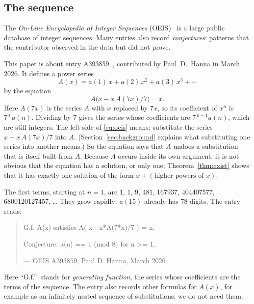 \documentclass[11pt,a4paper]{article}
\theoremstyle{definition}
\theoremstyle{remark}
\begin{document}
\subsection{The sequence}\label{sec:sequence}
The \emph{On-Line Encyclopedia of Integer Sequences} (OEIS)~\cite{oeisdb} is a large public database of integer
sequences. Many
entries also record \emph{conjectures}: patterns that the contributor observed in the data but did not prove.

This paper is about entry A393859~\cite{oeis}, contributed by Paul~D.~Hanna in March 2026. It defines a power series
\[
A(x)=a(1)\,x+a(2)\,x^2+a(3)\,x^3+\cdots
\]
by the equation
\begin{equation}\label{eq:oeis}
A\bigl(x-x\,A(7x)/7\bigr)=x.
\end{equation}
Here $A(7x)$ is the series $A$ with $x$ replaced by $7x$, so its coefficient of $x^n$ is
$7^n\,a(n)$. Dividing by $7$ gives the series whose coefficients are
$7^{\,n-1}a(n)$, which are still integers. The left side of \eqref{eq:oeis} means: substitute the series
$x-x\,A(7x)/7$ into $A$. (Section~\ref{sec:background} explains what substituting one
series into another means.) So the equation says that $A$ undoes a substitution that is itself built from $A$. Because
$A$ occurs inside its own argument, it is not obvious that the equation has a solution, or only one; Theorem~\ref{thm:exist}
shows that it has exactly one solution of the form $x+(\text{higher powers of }x)$.

The first terms, starting at $n=1$, are 1, 1, 9, 481, 167937, 404407577, 6800120127457, \dots{} They grow rapidly: $a(15)$
already has 78 digits. The entry reads:
\begin{quote}\small\ttfamily\raggedright G.f. A(x) satisfies A( x - x*A(7*x)/7 ) = x.\par\smallskip Conjecture: a(n) == 1 (mod 8) for n >= 1.\par\smallskip\hfill\textrm{--- OEIS A393859, Paul D. Hanna, March 2026}\end{quote}

Here ``G.f.''\ stands for \emph{generating function}, the series whose coefficients are the terms of the sequence.
The entry also records other formulas for $A(x)$, for example as an infinitely nested sequence of substitutions; we do
not need them.
\end{document}
